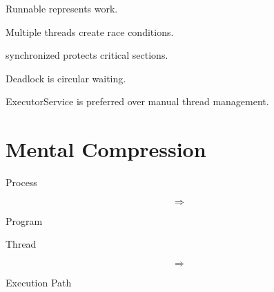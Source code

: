 \documentclass[11pt,a4paper]{book}
\begin{document}

\begin{rosettarule}

Runnable represents work.

\end{rosettarule}


\begin{rosettarule}

Multiple threads create race conditions.

\end{rosettarule}


\begin{rosettarule}

synchronized protects critical sections.

\end{rosettarule}


\begin{rosettarule}

Deadlock is circular waiting.

\end{rosettarule}


\begin{rosettarule}

ExecutorService is preferred over manual thread management.

\end{rosettarule}


\section{Mental Compression}

Process

\[
\Rightarrow
\]

Program


Thread

\[
\Rightarrow
\]

Execution Path
\end{document}
